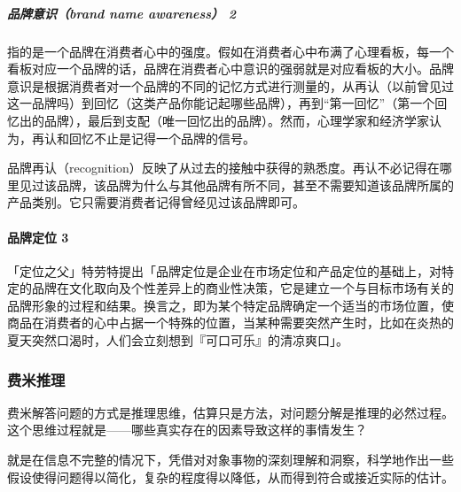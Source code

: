 \documentclass[letterpaper,10pt,english]{sphinxmanual}
\begin{document}
\subparagraph{品牌意识（brand name awareness） 2\sphinxfootnotemark[393]}
\label{\detokenize{chapter_idea/brand:brand-name-awareness-2}}%
\begin{footnotetext}[393]\sphinxAtStartFootnote
{}
%
\end{footnotetext}\ignorespaces 
指的是一个品牌在消费者心中的强度。假如在消费者心中布满了心理看板，每一个看板对应一个品牌的话，品牌在消费者心中意识的强弱就是对应看板的大小。品牌意识是根据消费者对一个品牌的不同的记忆方式进行测量的，从再认（以前曾见过这一品牌吗）到回忆（这类产品你能记起哪些品牌），再到“第一回忆”（第一个回忆出的品牌），最后到支配（唯一回忆出的品牌）。然而，心理学家和经济学家认为，再认和回忆不止是记得一个品牌的信号。

品牌再认（recognition）反映了从过去的接触中获得的熟悉度。再认不必记得在哪里见过该品牌，该品牌为什么与其他品牌有所不同，甚至不需要知道该品牌所属的产品类别。它只需要消费者记得曾经见过该品牌即可。


\paragraph{品牌定位 3\sphinxfootnotemark[394]}
\label{\detokenize{chapter_idea/brand:id7}}%
\begin{footnotetext}[394]\sphinxAtStartFootnote
{}
%
\end{footnotetext}\ignorespaces 
「定位之父」特劳特提出「品牌定位是企业在市场定位和产品定位的基础上，对特定的品牌在文化取向及个性差异上的商业性决策，它是建立一个与目标市场有关的品牌形象的过程和结果。换言之，即为某个特定品牌确定一个适当的市场位置，使商品在消费者的心中占据一个特殊的位置，当某种需要突然产生时，比如在炎热的夏天突然口渴时，人们会立刻想到『可口可乐』的清凉爽口」。


\subsubsection{费米推理}
\label{\detokenize{chapter_idea/decompose:id1}}\label{\detokenize{chapter_idea/decompose::doc}}
费米解答问题的方式是推理思维，估算只是方法，对问题分解是推理的必然过程。这个思维过程就是——哪些真实存在的因素导致这样的事情发生？

就是在信息不完整的情况下，凭借对对象事物的深刻理解和洞察，科学地作出一些假设使得问题得以简化，复杂的程度得以降低，从而得到符合或接近实际的估计。
\end{document}
